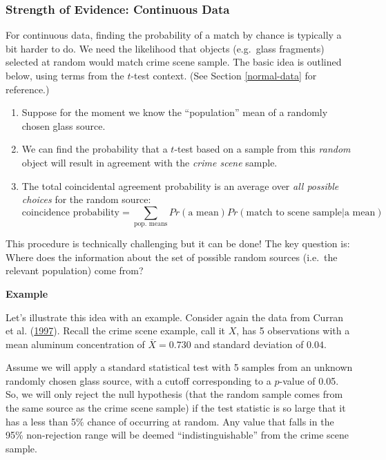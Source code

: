 \documentclass[]{book}
\providecommand{\tightlist}{%
  \setlength{\itemsep}{0pt}\setlength{\parskip}{0pt}}
\theoremstyle{definition}
\theoremstyle{definition}
\theoremstyle{remark}
\begin{document}
\subsubsection{Strength of Evidence: Continuous
Data}\label{strength-of-evidence-continuous-data}

For continuous data, finding the probability of a match by chance is
typically a bit harder to do. We need the likelihood that objects
(e.g.~glass fragments) selected at random would match crime scene
sample. The basic idea is outlined below, using terms from the
\(t\)-test context. (See Section \ref{normal-data} for reference.)

\begin{enumerate}
\def\labelenumi{\arabic{enumi}.}
\tightlist
\item
  Suppose for the moment we know the ``population'' mean of a randomly
  chosen glass source.
\item
  We can find the probability that a \(t\)-test based on a sample from
  this \emph{random} object will result in agreement with the
  \emph{crime scene} sample.
\item
  The total coincidental agreement probability is an average over
  \emph{all possible choices} for the random source:
  \[ \text{coincidence probability} = \sum\limits_{\text{pop. means}} Pr(\text{a mean}) Pr(\text{match to scene sample} | \text{a mean})\]
\end{enumerate}

This procedure is technically challenging but it can be done! The key
question is: Where does the information about the set of possible random
sources (i.e.~the relevant population) come from?

\textbf{Example}

Let's illustrate this idea with an example. Consider again the data from
Curran et al. (\protect\hyperlink{ref-curranetal}{1997}). Recall the
crime scene example, call it \(X\), has 5 observations with a mean
aluminum concentration of \(\overline{X} = 0.730\) and standard
deviation of \(0.04\).

Assume we will apply a standard statistical test with 5 samples from an
unknown randomly chosen glass source, with a cutoff corresponding to a
\(p\)-value of 0.05. So, we will only reject the null hypothesis (that
the random sample comes from the same source as the crime scene sample)
if the test statistic is so large that it has a less than 5\% chance of
occurring at random. Any value that falls in the 95\% non-rejection
range will be deemed ``indistinguishable'' from the crime scene sample.
\end{document}
